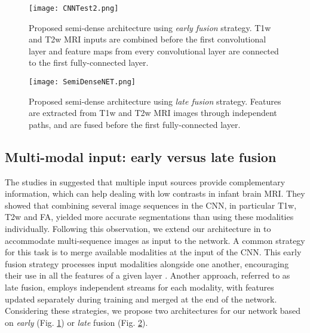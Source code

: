 \documentclass[twoside,espcrc2]{elsarticle}
\begin{document}
\begin{figure}[ht!]
\centering
\begin{center} 
        \texttt{[image: CNNTest2.png]}
\caption{Proposed semi-dense architecture using \textit{early fusion} strategy. T1w and T2w MRI inputs are combined before the first convolutional layer and feature maps from every convolutional layer are connected to the first fully-connected layer.}
\label{fig:CNN_archit_Early}
\end{center}        
\end{figure}

\begin{figure}[ht!]
\centering
\begin{center} 
        \texttt{[image: SemiDenseNET.png]}
\caption{Proposed semi-dense architecture using \textit{late fusion} strategy. Features are extracted from T1w and T2w MRI images through independent paths, and are fused before the first fully-connected layer.}
\label{fig:CNN_archit_Late}
\end{center}        
\end{figure}

\subsection{Multi-modal input: early versus late fusion}
\label{ssec:multi-source}

The studies in \cite{zhang2015deep,nie2016fully} suggested that multiple input sources provide complementary information, which can help dealing with low contrasts in infant brain MRI. They showed that combining several image sequences in the CNN, in particular T1w, T2w and FA, yielded more accurate segmentations than using these modalities individually. Following this observation, we extend our architecture in \cite{DolzNeuro2017} to accommodate multi-sequence images as input to the network. A common strategy for this task is to merge available modalities at the input of the CNN. This early fusion strategy processes input modalities alongside one another, encouraging their use in all the features of a given layer  \cite{zhang2015deep}. Another approach, referred to as late fusion, employs independent streams for each modality, with features updated separately during training and merged at the end of the network. Considering these strategies, we propose two architectures for our network based on \textit{early} (Fig. \ref{fig:CNN_archit_Early}) or \textit{late} fusion (Fig. \ref{fig:CNN_archit_Late}). 
\end{document}
